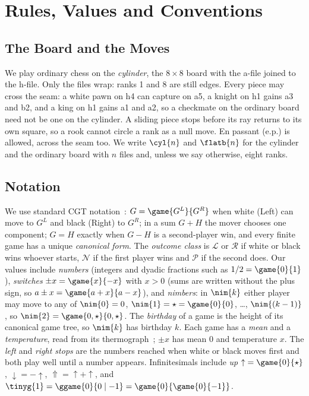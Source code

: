 \section{Rules, Values and Conventions}\label{sec:rules}

\subsection{The Board and the Moves}
We play ordinary chess on the \emph{cylinder}, the $8\times8$ board with the a-file joined to the h-file. Only
the files wrap: ranks 1 and 8 are still edges. Every piece may cross the seam: a white pawn on h4 can capture on
a5, a knight on h1 gains a3 and b2, and a king on h1 gains a1 and a2, so a checkmate on the ordinary board need
not be one on the cylinder. A sliding piece stops before its ray returns to its own square, so a rook cannot
circle a rank as a null move. En passant (e.p.) is allowed, across the seam too. We write $\cyl{n}$ and
$\flatb{n}$ for the cylinder and the ordinary board with $n$ files and, unless we say otherwise, eight ranks.

\subsection{Notation}\label{sec:notation}
We use standard CGT notation~\cite{WinningWays,ONAG,Siegel2013}: $G=\game{G^L}{G^R}$ when white (Left)
can move to $G^L$ and black (Right) to $G^R$; in a sum $G+H$ the mover chooses one component; $G=H$ exactly
when $G-H$ is a second-player win, and every finite game has a unique \emph{canonical form}. The \emph{outcome class} is $\mathcal{L}$ or $\mathcal{R}$ if white or black wins whoever starts,
$\mathcal{N}$ if the first player wins and $\mathcal{P}$ if the second does. Our values include \emph{numbers}
(integers and dyadic fractions such as $1/2=\game{0}{1}$), \emph{switches} $\pm x=\game{x}{-x}$ with $x>0$
(sums are written without the plus sign, so $a\pm x=\game{a+x}{a-x}$), and \emph{nimbers}: in $\nim{k}$ either
player may move to any of $\nim{0}=0$, $\nim{1}=\star=\game{0}{0}$, \dots, $\nim{(k-1)}$, so
$\nim{2}=\game{0,\star}{0,\star}$. The \emph{birthday} of a game is the height of its canonical game tree, so
$\nim{k}$ has birthday $k$. Each game has a \emph{mean} and a \emph{temperature}, read from its
thermograph~\cite{WinningWays}; $\pm x$ has mean $0$ and temperature $x$. The \emph{left} and \emph{right stops}
are the numbers reached when white or black moves first and both play well until a number appears. Infinitesimals
include \emph{up} ${\uparrow}=\game{0}{\star}$, ${\downarrow}=-{\uparrow}$, ${\Uparrow}={\uparrow}+{\uparrow}$,
and $\tinyg{1}=\ggame{0}{0\mid -1}=\game{0}{\game{0}{-1}}$.

